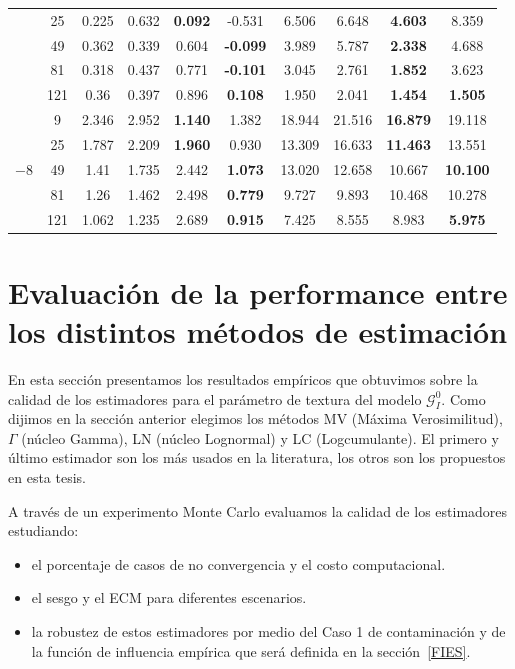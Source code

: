 \begin{table}[hbt]
\begin{tabular}{cc|SSSS|SSSS}
		&  25 	&  0.225 	&  0.632 	&  \bfseries{0.092} 	  	&  -0.531 			    &  6.506 	    &  6.648 		&   \bfseries 4.603  	 &  8.359  \\ 
		&  49 	&  0.362	&  0.339 	&  0.604 	 				&   \bfseries -0.099  	&  3.989 	    &  5.787 	    &   \bfseries 2.338  	 &  4.688  \\ 
		&  81 	&  0.318 	&  0.437 	&  0.771 	 				&   \bfseries -0.101  	&  3.045 	    &  2.761 	    &   \bfseries 1.852  	 &  3.623  \\ 
		&  121 	&  0.36 	&  0.397 	&  0.896 	 				&   \bfseries 0.108  	&  1.950 	    &  2.041 	    &   \bfseries 1.454 	 &   \bfseries 1.505  \\ 
		\cmidrule(r){1-6}
		\cmidrule(r){7-10}									
		&  9 	&  2.346 	&  2.952    &   \bfseries 1.140       	&  1.382 				& 18.944		&  21.516 	&   \bfseries 16.879  	 &  19.118  \\ 
		&  25 	&  1.787 	&  2.209 	&   \bfseries 1.960  		&  0.930 				&  13.309 	 	&  16.633 	&   \bfseries 11.463  	 &  13.551  \\ 
		&  49 	&  1.41 	&  1.735 	&  2.442 				&   \bfseries 1.073  		&  13.020 	    &  12.658   &  10.667 	         &   \bfseries 10.100  \\ 
		&  81 	&  1.26 	&  1.462 	&  2.498 				&   \bfseries 0.779  		&  9.727 	    &  9.893 	&  10.468 	 		 &  10.278   \\ 
		&  121 	&  1.062 	&  1.235 	&  2.689 				&   \bfseries 0.915  		&  7.425 	    &  8.555 	&  8.983 	         &   \bfseries 5.975    \\ 
		\bottomrule 								
	\end{tabular}																			
\end{table}										


\section{Evaluación de la performance entre los distintos métodos de estimación}

En esta sección presentamos los resultados empíricos que obtuvimos sobre la calidad de los estimadores para el parámetro de textura del modelo $\mathcal G_I^0$. Como dijimos en la sección anterior elegimos los métodos MV (Máxima Verosimilitud), $\Gamma$ (núcleo Gamma), LN (núcleo Lognormal) y LC (Logcumulante). El primero y último estimador son los más usados en la literatura, los otros son los propuestos en esta tesis.

A través de un experimento Monte Carlo evaluamos la calidad de los estimadores estudiando:
\begin{itemize}
	\item el porcentaje de casos de no convergencia y el costo computacional.
	\item el sesgo y el ECM para diferentes escenarios.
	\item la robustez de estos estimadores por medio del Caso 1 de contaminación y de la función de influencia empírica que será definida en la sección~\ref{FIES}.
\end{itemize} 

